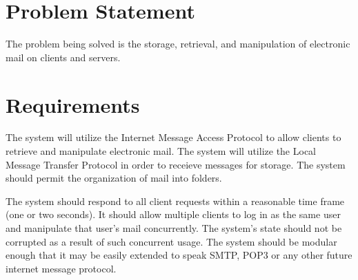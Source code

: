 \documentclass[a4paper,12pt]{article}
\begin{document}

\section*{Problem Statement}

The problem being solved is the storage, retrieval, and manipulation of electronic mail on clients and servers.

\section*{Requirements}

The system will utilize the Internet Message Access Protocol to allow clients to retrieve and manipulate electronic mail. The system will utilize the Local Message Transfer Protocol in order to receieve messages for storage. The system should permit the organization of mail into folders. %

The system should respond to all client requests within a reasonable time frame (one or two seconds). It should allow multiple clients to log in as the same user and manipulate that user's mail concurrently. The system's state should not be corrupted as a result of such concurrent usage. The system should be modular enough that it may be easily extended to speak SMTP, POP3 or any other future internet message protocol.
\end{document}
